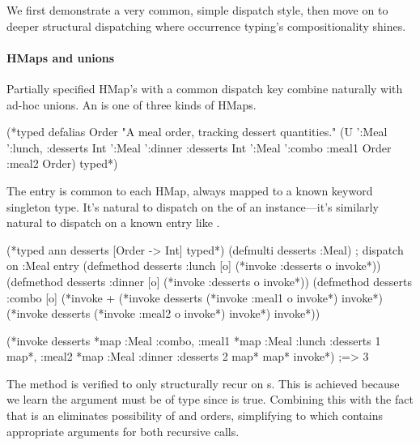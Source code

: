 We first demonstrate a very common, simple dispatch style,
then move on to deeper structural dispatching where occurrence typing's
compositionality shines.

\paragraph{HMaps and unions} Partially specified HMap's with a common dispatch key
combine naturally with ad-hoc unions.
An  is one of three kinds of HMaps.


\begin{cljlisting}
(*typed defalias Order "A meal order, tracking dessert quantities."
  (U '{:Meal ':lunch, :desserts Int} '{:Meal ':dinner :desserts Int}
     '{:Meal ':combo :meal1 Order :meal2 Order}) typed*)
\end{cljlisting}

The  entry is common to each HMap, always mapped to a known keyword singleton
type.
It's natural to dispatch on the  of an instance---it's similarly
natural to dispatch on a known entry like .

\begin{minipage}{\linewidth}
\begin{exmp}
\begin{cljlisting}
(*typed ann desserts [Order -> Int] typed*)
(defmulti desserts :Meal)  ; dispatch on :Meal entry
(defmethod desserts :lunch [o] (*invoke :desserts o invoke*))
(defmethod desserts :dinner [o] (*invoke :desserts o invoke*))
(defmethod desserts :combo [o] 
  (*invoke + (*invoke desserts (*invoke :meal1 o invoke*) invoke*) (*invoke desserts (*invoke :meal2 o invoke*) invoke*) invoke*))

(*invoke desserts {*map :Meal :combo, :meal1 {*map :Meal :lunch :desserts 1 map*}, 
           :meal2 {*map :Meal :dinner :desserts 2 map*} map*} invoke*) ;=> 3
\end{cljlisting}
\label{example:desserts-on-meal}
\end{exmp}
\end{minipage}

The  method is verified to only structurally recur
on s. This is achieved because we learn the argument  must
be of type
since
is true. Combining this
with the fact that  is an 
eliminates possibility of  and 
orders, simplifying  to
which contains appropriate arguments for both recursive calls.

